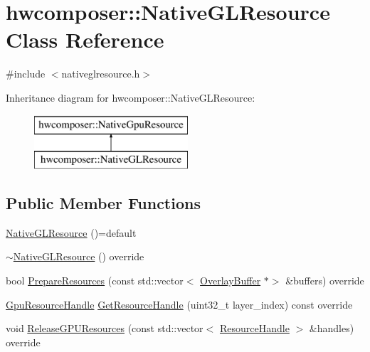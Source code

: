 \hypertarget{classhwcomposer_1_1NativeGLResource}{}\section{hwcomposer\+:\+:Native\+G\+L\+Resource Class Reference}
\label{classhwcomposer_1_1NativeGLResource}


{\ttfamily \#include $<$nativeglresource.\+h$>$}

Inheritance diagram for hwcomposer\+:\+:Native\+G\+L\+Resource\+:\begin{figure}[H]
\begin{center}
\leavevmode
\includegraphics[height=2.000000cm]{classhwcomposer_1_1NativeGLResource}
\end{center}
\end{figure}
\subsection*{Public Member Functions}
\begin{DoxyCompactItemize}
\item 
\mbox{\hyperlink{classhwcomposer_1_1NativeGLResource_af59a83a68eab750f4b7a233965aa8800}{Native\+G\+L\+Resource}} ()=default
\item 
\mbox{\hyperlink{classhwcomposer_1_1NativeGLResource_aa54cf09584732f4d1608ecb374871620}{$\sim$\+Native\+G\+L\+Resource}} () override
\item 
bool \mbox{\hyperlink{classhwcomposer_1_1NativeGLResource_a1d9a2081a910c8fbac2e15ac17f89087}{Prepare\+Resources}} (const std\+::vector$<$ \mbox{\hyperlink{classhwcomposer_1_1OverlayBuffer}{Overlay\+Buffer}} $\ast$$>$ \&buffers) override
\item 
\mbox{\hyperlink{namespacehwcomposer_a3da411c7c0213da2ce847c654bdc180d}{Gpu\+Resource\+Handle}} \mbox{\hyperlink{classhwcomposer_1_1NativeGLResource_a9aa59ce44d000463c466fc0c5f91b3d4}{Get\+Resource\+Handle}} (uint32\+\_\+t layer\+\_\+index) const override
\item 
void \mbox{\hyperlink{classhwcomposer_1_1NativeGLResource_a6a54502d70215d3c65ba23bb59ac5cef}{Release\+G\+P\+U\+Resources}} (const std\+::vector$<$ \mbox{\hyperlink{namespacehwcomposer_a963c5a1d5902d2d05710dba19af35b48}{Resource\+Handle}} $>$ \&handles) override
\end{DoxyCompactItemize}


